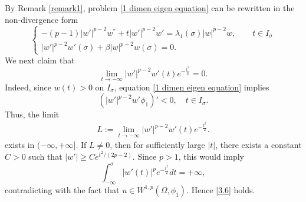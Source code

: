 \documentclass[11pt,leqno]{amsart}
\numberwithin{equation}{section}
\begin{document}
By Remark \ref{remark1}, problem \eqref{1 dimen eigen equation} can be rewritten in the non-divergence form
\begin{equation}\label{3.5}
\begin{cases}
-(p-1)|w'|^{p-2}w^{''}+t|w'|^{p-2}w'=\lambda_1(\sigma)|w|^{p-2}w,\qquad t\in I_{\sigma}\\
|w'|^{p-2}w'(\sigma)+\beta|w|^{p-2}w(\sigma)=0.
\end{cases}
\end{equation}
We next claim that
\begin{equation}\label{3.6}
\lim\limits_{t\rightarrow -\infty}|w'|^{p-2}w'(t)e^{-\frac{t^2}{2}}=0.
\end{equation}
Indeed, since $w(t)>0$ on $I_{\sigma}$, equation \eqref{1 dimen eigen equation} implies
\begin{equation*}%
\left(|w'|^{p-2}w'\phi _1\right)'<0, \quad t\in I_{\sigma}.
\end{equation*}
Thus, the limit 
\begin{align*}
   L:=\lim\limits_{t\rightarrow -\infty}|w'|^{p-2}w'(t)e^{-\frac{t^2}{2}}.
\end{align*}
exists in $(-\infty, +\infty]$. If  $L\neq 0$, then for sufficiently large $|t|$, there exists a constant $C>0$ such that $|w'|\geq Ce^{t^2/(2p-2)}$.  Since  $p>1$, this  would imply 
$$
\int_{-\infty}^\sigma |w'(t)|^pe^{-\frac{t^2}{2}}dt=+\infty,
$$
 contradicting with the fact that $u\in W^{1,p}(\Omega, \phi _1)$. Hence \eqref{3.6} holds. 
\end{document}
